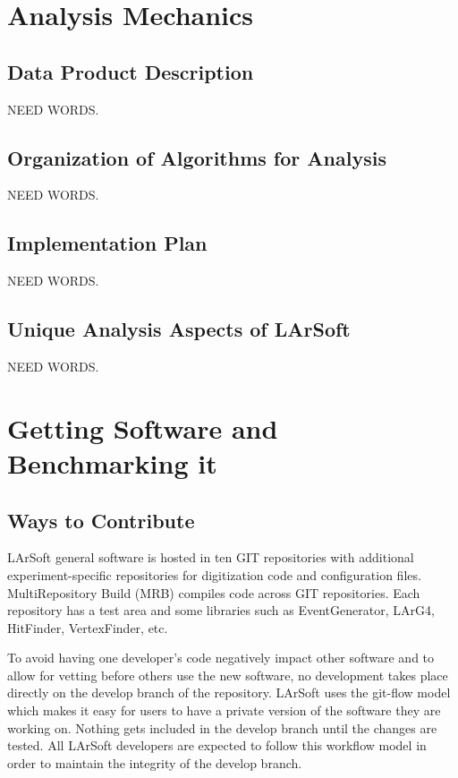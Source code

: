 \documentclass[12pt]{elsarticle}
\begin{document}
               
\section{Analysis Mechanics}

\subsection{Data Product Description}
NEED WORDS.

\subsection{Organization of Algorithms for Analysis}
NEED WORDS.

\subsection{Implementation Plan}
NEED WORDS.

\subsection{Unique Analysis Aspects of LArSoft}
NEED WORDS.

\section{Getting Software and Benchmarking it}
\subsection{Ways to Contribute}

LArSoft general software is hosted in ten GIT repositories with additional experiment-specific repositories for digitization code and configuration files. MultiRepository Build (MRB) compiles code across GIT repositories. Each repository has a test area and some libraries such as EventGenerator, LArG4, HitFinder, VertexFinder, etc.\cite{gian}

To avoid having one developer's code negatively impact other software and to allow for vetting before others use the new software, no development takes place directly on the develop branch of the repository. LArSoft uses the git-flow\cite{git-flow} model which makes it easy for users to have a private version of the software they are working on. Nothing gets included in the develop branch until the changes are tested.\cite{git-control} All LArSoft developers are expected to follow this workflow model in order to maintain the integrity of the develop branch.
\end{document}
